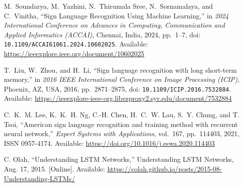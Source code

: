 \documentclass[12pt]{article}
\begin{document}
\begin{thebibliography}{99}
M.~Soundarya, M.~Yazhini, N.~Thirumala Sree, N.~Sornamalaya, and C.~Vinitha, 
“Sign Language Recognition Using Machine Learning,” 
in \emph{2024 International Conference on Advances in Computing, Communication and Applied Informatics (ACCAI)}, 
Chennai, India, 2024, pp.~1--7, 
doi: \texttt{10.1109/ACCAI61061.2024.10602025}.
Available: \url{https://ieeexplore.ieee.org/document/10602025}

T.~Liu, W.~Zhou, and H.~Li, 
“Sign language recognition with long short-term memory,” 
in \emph{2016 IEEE International Conference on Image Processing (ICIP)}, 
Phoenix, AZ, USA, 2016, pp.~2871--2875, 
doi: \texttt{10.1109/ICIP.2016.7532884}. 
Available: \url{https://ieeexplore-ieee-org.libezproxy2.syr.edu/document/7532884}

C.~K.~M. Lee, K.~K.~H. Ng, C.-H. Chen, H.~C.~W. Lau, S.~Y. Chung, and T. Tsoi, 
“American sign language recognition and training method with recurrent neural network,” 
\textit{Expert Systems with Applications}, vol.~167, pp.~114403, 2021,  
ISSN 0957-4174.  
Available: \url{https://doi.org/10.1016/j.eswa.2020.114403} 

C. Olah, 
“Understanding LSTM Networks,” 
Understanding LSTM Networks, Aug. 17, 2015. [Online].  
Available: \url{https://colah.github.io/posts/2015-08-Understanding-LSTMs/}


\end{thebibliography}
\end{document}
